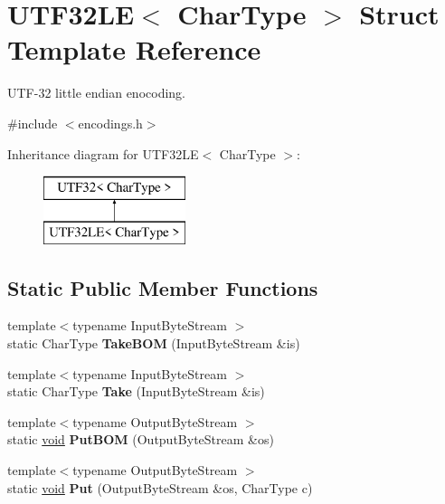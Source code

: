 \hypertarget{struct_u_t_f32_l_e}{}\section{U\+T\+F32\+L\+E$<$ Char\+Type $>$ Struct Template Reference}
\label{struct_u_t_f32_l_e}


U\+T\+F-\/32 little endian enocoding.  




{\ttfamily \#include $<$encodings.\+h$>$}

Inheritance diagram for U\+T\+F32\+L\+E$<$ Char\+Type $>$\+:\begin{figure}[H]
\begin{center}
\leavevmode
\includegraphics[height=2.000000cm]{struct_u_t_f32_l_e}
\end{center}
\end{figure}
\subsection*{Static Public Member Functions}
\begin{DoxyCompactItemize}
\item 
\hypertarget{struct_u_t_f32_l_e_a8729612b0a8b1126c61c4f8f8c34410e}{}{\footnotesize template$<$typename Input\+Byte\+Stream $>$ }\\static Char\+Type {\bfseries Take\+B\+O\+M} (Input\+Byte\+Stream \&is)\label{struct_u_t_f32_l_e_a8729612b0a8b1126c61c4f8f8c34410e}

\item 
\hypertarget{struct_u_t_f32_l_e_ad13967549811be12897362bb37b2c819}{}{\footnotesize template$<$typename Input\+Byte\+Stream $>$ }\\static Char\+Type {\bfseries Take} (Input\+Byte\+Stream \&is)\label{struct_u_t_f32_l_e_ad13967549811be12897362bb37b2c819}

\item 
\hypertarget{struct_u_t_f32_l_e_accd97d45e55746c900dab356605825be}{}{\footnotesize template$<$typename Output\+Byte\+Stream $>$ }\\static \hyperlink{_s_d_l__audio_8h_a52835ae37c4bb905b903cbaf5d04b05f}{void} {\bfseries Put\+B\+O\+M} (Output\+Byte\+Stream \&os)\label{struct_u_t_f32_l_e_accd97d45e55746c900dab356605825be}

\item 
\hypertarget{struct_u_t_f32_l_e_a61bb50e7fba27e3fe28a9f30eb366193}{}{\footnotesize template$<$typename Output\+Byte\+Stream $>$ }\\static \hyperlink{_s_d_l__audio_8h_a52835ae37c4bb905b903cbaf5d04b05f}{void} {\bfseries Put} (Output\+Byte\+Stream \&os, Char\+Type c)\label{struct_u_t_f32_l_e_a61bb50e7fba27e3fe28a9f30eb366193}

\end{DoxyCompactItemize}
